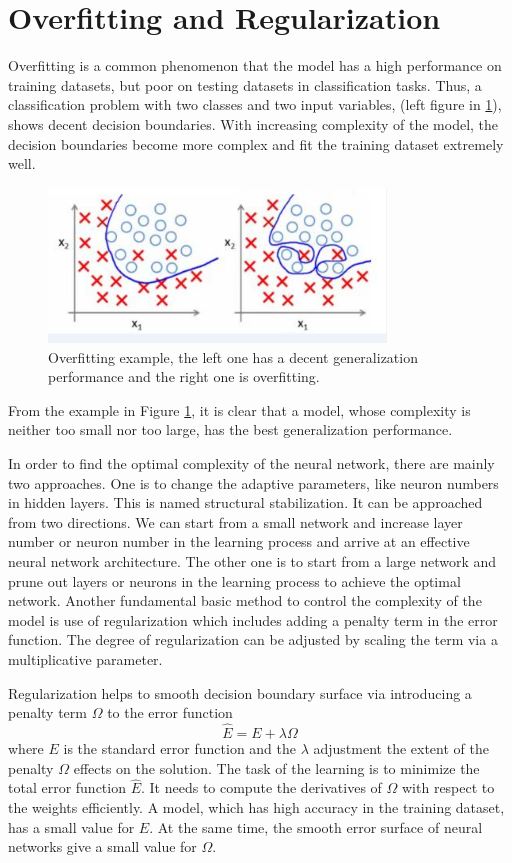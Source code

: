 \section{Overfitting and Regularization}

Overfitting is a common phenomenon that the model has a high performance on training datasets, but poor on testing datasets in classification tasks. Thus, a classification problem with two classes and two input variables, (left figure in \ref{fig:OverfittingExample}), shows decent decision boundaries. With increasing complexity of the model, the decision boundaries become more complex and fit the training dataset extremely well. 
\graphicspath{ {./Figures/} }
\begin{figure}[!htb]
\centering
\includegraphics[width=0.8\textwidth]{overfitting.png}
\caption{\label{fig:OverfittingExample}Overfitting example, the left one has a decent generalization performance and the right one is overfitting.}
\end{figure}
From the example in Figure \ref{fig:OverfittingExample}, it is clear that a model, whose complexity is neither too small nor too large, has the best generalization performance. 

In order to find the optimal complexity of the neural network, there are mainly two approaches. One is to change the adaptive parameters, like neuron numbers in hidden layers. This is named structural stabilization. It can be approached from two directions. We can start from a small network and increase layer number or neuron number in the learning process and arrive at an effective neural network architecture. The other one is to start from a large network and prune out layers or neurons in the learning process to achieve the optimal network. Another fundamental basic method to control the complexity of the model is use of regularization which includes adding a penalty term in the error function. The degree of regularization can be adjusted by scaling the term via a multiplicative parameter.

Regularization helps to smooth decision boundary surface via introducing a penalty term $\Omega$ to the error function
\begin{equation}\label{eq:Regularization}
\hat{E} = E + \lambda\Omega
\end{equation}
where $E$ is the standard error function and the $\lambda$ adjustment the extent of the penalty $\Omega$ effects on the solution. The task of the learning is to minimize the total error function $\hat{E}$. It needs to compute the derivatives of $\Omega$ with respect to the weights efficiently. A model, which has high accuracy in the training dataset, has a small value for $E$. At the same time, the smooth error surface of neural networks give a small value for $\Omega$.

